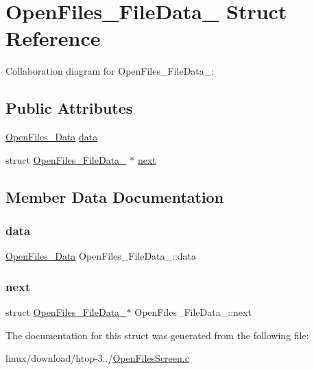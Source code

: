 \hypertarget{structOpenFiles__FileData__}{}\section{Open\+Files\+\_\+\+File\+Data\+\_\+ Struct Reference}
\label{structOpenFiles__FileData__}


Collaboration diagram for Open\+Files\+\_\+\+File\+Data\+\_\+\+:
\subsection*{Public Attributes}
\begin{DoxyCompactItemize}
\item 
\hyperlink{OpenFilesScreen_8c_a970c2a88b9b6bb8907ac74fc674a9880}{Open\+Files\+\_\+\+Data} \hyperlink{structOpenFiles__FileData___afc37196c111b01c62b8feaf03426cf3b}{data}
\item 
struct \hyperlink{structOpenFiles__FileData__}{Open\+Files\+\_\+\+File\+Data\+\_\+} $\ast$ \hyperlink{structOpenFiles__FileData___aa33d558e3b8bb8af25de43578d68b182}{next}
\end{DoxyCompactItemize}


\subsection{Member Data Documentation}
\mbox{\label{structOpenFiles__FileData___afc37196c111b01c62b8feaf03426cf3b}} 
\subsubsection{\texorpdfstring{data}{data}}
{\footnotesize\ttfamily \hyperlink{OpenFilesScreen_8c_a970c2a88b9b6bb8907ac74fc674a9880}{Open\+Files\+\_\+\+Data} Open\+Files\+\_\+\+File\+Data\+\_\+\+::data}

\mbox{\label{structOpenFiles__FileData___aa33d558e3b8bb8af25de43578d68b182}} 
\subsubsection{\texorpdfstring{next}{next}}
{\footnotesize\ttfamily struct \hyperlink{structOpenFiles__FileData__}{Open\+Files\+\_\+\+File\+Data\+\_\+}$\ast$ Open\+Files\+\_\+\+File\+Data\+\_\+\+::next}



The documentation for this struct was generated from the following file\+:\begin{DoxyCompactItemize}
\item 
linux/download/htop-\/3../\hyperlink{OpenFilesScreen_8c}{Open\+Files\+Screen.\+c}\end{DoxyCompactItemize}
